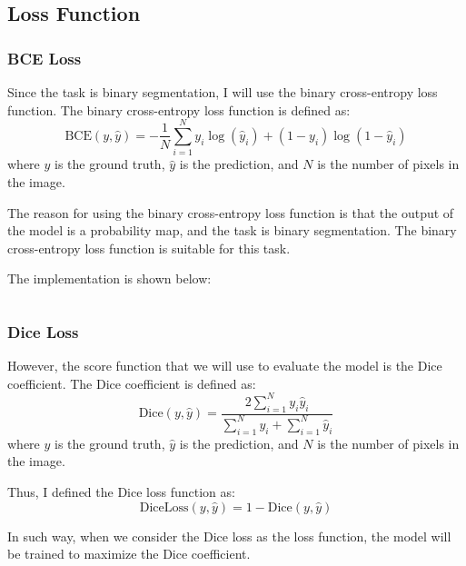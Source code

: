 \subsection{Loss Function}
\label{sec:loss_function}

\subsubsection{BCE Loss}

Since the task is binary segmentation, I will use the binary cross-entropy loss function.
The binary cross-entropy loss function is defined as:
\begin{equation}
    \text{BCE}(y, \hat{y}) = -\frac{1}{N} \sum_{i=1}^{N} y_i \log(\hat{y}_i) + (1 - y_i) \log(1 - \hat{y}_i)
\end{equation}
where $y$ is the ground truth, $\hat{y}$ is the prediction, and $N$ is the number of pixels in the image.

The reason for using the binary cross-entropy loss function is that the output of the model is a probability map, and the task is binary segmentation.
The binary cross-entropy loss function is suitable for this task.

The implementation is shown below:

\inputminted[firstline=23, lastline=28, highlightlines=25]{python}{../src/utils.py}

\subsubsection{Dice Loss}

However, the score function that we will use to evaluate the model is the Dice coefficient.
The Dice coefficient is defined as:
\begin{equation}
    \text{Dice}(y, \hat{y}) = \frac{2 \sum_{i=1}^{N} y_i \hat{y}_i}{\sum_{i=1}^{N} y_i + \sum_{i=1}^{N} \hat{y}_i}
\end{equation}
where $y$ is the ground truth, $\hat{y}$ is the prediction, and $N$ is the number of pixels in the image.

Thus, I defined the Dice loss function as:
\begin{equation}
    \text{DiceLoss}(y, \hat{y}) = 1 - \text{Dice}(y, \hat{y})
\end{equation}

In such way, when we consider the Dice loss as the loss function, the model will be trained to maximize the Dice coefficient.

